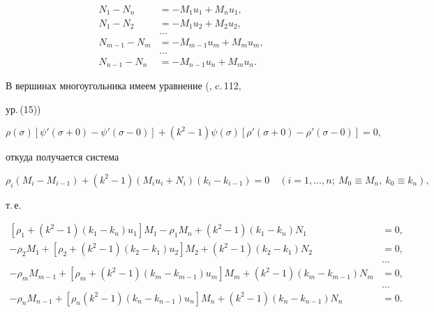 \begin{equation}


\begin{split}


N_1-N_n&=-M_1u_1+M_nu_1,\\


N_1-N_2&=-M_1u_2+M_2u_2,\\


&\dots\\


N_{m-1}-N_m&=-M_{m-1}u_m+M_mu_m,\\


&\dots\\


N_{n-1}-N_n&=-M_{n-1}u_n+M_mu_n.


\end{split}


\end{equation}


В вершинах многоугольника имеем уравнение (\cite{Kohn}, c.\,112,


ур.\,(15))


\begin{equation}


\rho(\sigma)[\psi'(\sigma+0)-\psi'(\sigma-0)]+


(k^2-1)\psi(\sigma)[\rho'(\sigma+0)-\rho'(\sigma-0)]=0,


\end{equation}


откуда получается система


$$


\rho_i(M_i-M_{i-1})+(k^2-1)(M_iu_i+N_i)(k_i-k_{i-1})=0


\quad (i=1,\dotsc,n; \ M_0\equiv M_n, \ k_0\equiv k_n),


$$


т.\,е.


\begin{equation}


\begin{split}


[\rho_1+(k^2-1)(k_1-k_n)u_1]M_1-\rho_1M_n+(k^2-1)(k_1-k_n)N_1&=0,\\


-\rho_2M_1+[\rho_2+(k^2-1)(k_2-k_1)u_2]M_2+


(k^2-1)(k_2-k_1)N_2&=0,\\


&\dots\\


-\rho_mM_{m-1}+[\rho_m+(k^2-1)(k_m-k_{m-1})u_m]M_m


+(k^2-1)(k_m-k_{m-1})N_m&=0,\\


&\dots\\


-\rho_nM_{n-1}+[\rho_n(k^2-1)(k_n-k_{n-1})u_n]M_n


+(k^2-1)(k_n-k_{n-1})N_n&=0.


\end{split}


\end{equation}


